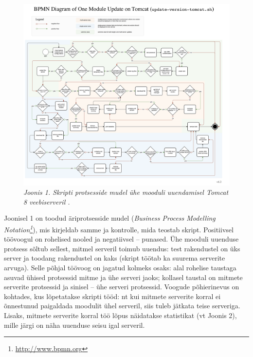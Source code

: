 \documentclass[12pt]{report}
\begin{document}
   \begin{figure}[H]
     \begin{center}
       \includegraphics[width=.8\textwidth]{diagrams/BPMN-diagram-one-module-tomcat.png}
       \caption*{\textit{Joonis 1. Skripti protsesside mudel ühe mooduli uuendamisel Tomcat 8 veebiserveril \footnotemark{}.}}
     \end{center}
   \end{figure}
   
   
   \newpage
   
   Joonisel 1 on toodud äriprotsesside mudel (\textit{Business Process Modelling Notation\footnote{\url{http://www.bpmn.org}}}), mis kirjeldab samme ja kontrolle, mida teostab skript. Positiivsel töövoogul on rohelised nooled ja negatiivsel \--- punased. Ühe mooduli uuenduse protsess sõltub sellest, mitmel serveril toimub uuendus: test rakendustel on üks server ja toodang rakendustel on kaks (skript töötab ka suurema serverite arvuga). Selle põhjal töövoog on jagatud kolmeks osaks: alal rohelise taustaga asuvad ühised protsessid mitme ja ühe serveri jaoks; kollasel taustal on mitmete serverite protsessid ja sinisel \--- ühe serveri protsessid. Voogude põhierinevus on kohtades, kus lõpetatakse skripti tööd: nt kui mitmete serverite korral ei õnnestunud paigaldada moodulit ühel serveril, siis tuleb jätkata teise serveriga. Lisaks, mitmete serverite korral töö lõpus näidatakse statistikat (vt Joonis 2), mille järgi on näha uuenduse seisu igal serveril.\\
   
\end{document}
